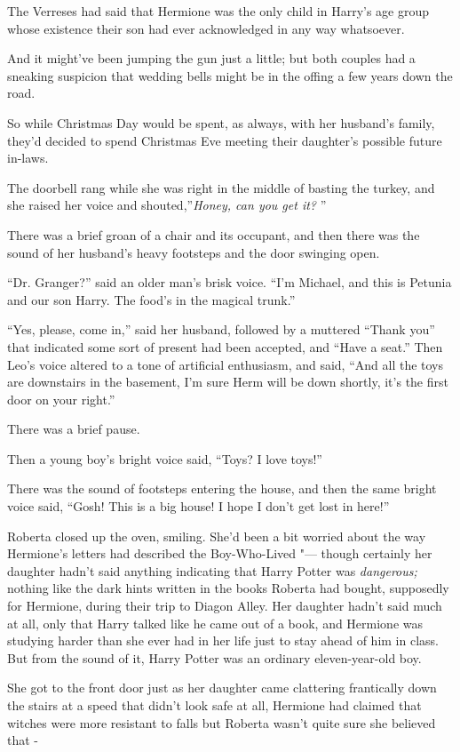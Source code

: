 The Verreses had said that Hermione was the only child in Harry's age
group whose existence their son had ever acknowledged in any way
whatsoever.

And it might've been jumping the gun just a little; but both couples had
a sneaking suspicion that wedding bells might be in the offing a few
years down the road.

So while Christmas Day would be spent, as always, with her husband's
family, they'd decided to spend Christmas Eve meeting their daughter's
possible future in-laws.

The doorbell rang while she was right in the middle of basting the
turkey, and she raised her voice and shouted,''\emph{Honey, can you get
it?} ''

There was a brief groan of a chair and its occupant, and then there was
the sound of her husband's heavy footsteps and the door swinging open.

``Dr. Granger?'' said an older man's brisk voice. ``I'm Michael, and
this is Petunia and our son Harry. The food's in the magical trunk.''

``Yes, please, come in,'' said her husband, followed by a muttered
``Thank you'' that indicated some sort of present had been accepted, and
``Have a seat.'' Then Leo's voice altered to a tone of artificial
enthusiasm, and said, ``And all the toys are downstairs in the basement,
I'm sure Herm will be down shortly, it's the first door on your right.''

There was a brief pause.

Then a young boy's bright voice said, ``Toys? I love toys!''

There was the sound of footsteps entering the house, and then the same
bright voice said, ``Gosh! This is a big house! I hope I don't get lost
in here!''

Roberta closed up the oven, smiling. She'd been a bit worried about the
way Hermione's letters had described the Boy-Who-Lived "--- though
certainly her daughter hadn't said anything indicating that Harry Potter
was \emph{dangerous;} nothing like the dark hints written in the books
Roberta had bought, supposedly for Hermione, during their trip to Diagon
Alley. Her daughter hadn't said much at all, only that Harry talked like
he came out of a book, and Hermione was studying harder than she ever
had in her life just to stay ahead of him in class. But from the sound
of it, Harry Potter was an ordinary eleven-year-old boy.

She got to the front door just as her daughter came clattering
frantically down the stairs at a speed that didn't look safe at all,
Hermione had claimed that witches were more resistant to falls but
Roberta wasn't quite sure she believed that -

